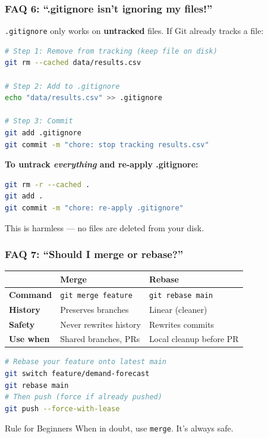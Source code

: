 \documentclass{beamer}
\begin{document}
\begin{frame}[fragile]
\frametitle{FAQ 6: ``.gitignore isn't ignoring my files!''}

\texttt{.gitignore} only works on \textbf{untracked} files. If Git already tracks a file:

\begin{lstlisting}[language=bash]
# Step 1: Remove from tracking (keep file on disk)
git rm --cached data/results.csv

# Step 2: Add to .gitignore
echo "data/results.csv" >> .gitignore

# Step 3: Commit
git add .gitignore
git commit -m "chore: stop tracking results.csv"
\end{lstlisting}

\textbf{To untrack \textit{everything} and re-apply .gitignore:}
\begin{lstlisting}[language=bash]
git rm -r --cached .
git add .
git commit -m "chore: re-apply .gitignore"
\end{lstlisting}

\small This is harmless --- no files are deleted from your disk.
\end{frame}

\begin{frame}[fragile]
\frametitle{FAQ 7: ``Should I merge or rebase?''}

\begin{table}[h]
\centering
\small
\begin{tabular}{lll}
\toprule
 & \textbf{Merge} & \textbf{Rebase} \\
\midrule
\textbf{Command} & \texttt{git merge feature} & \texttt{git rebase main} \\
\textbf{History} & Preserves branches & Linear (cleaner) \\
\textbf{Safety} & Never rewrites history & Rewrites commits \\
\textbf{Use when} & Shared branches, PRs & Local cleanup before PR \\
\bottomrule
\end{tabular}
\end{table}

\begin{lstlisting}[language=bash]
# Rebase your feature onto latest main
git switch feature/demand-forecast
git rebase main
# Then push (force if already pushed)
git push --force-with-lease
\end{lstlisting}

\begin{block}{Rule for Beginners}
When in doubt, use \texttt{merge}. It's always safe.
\end{block}
\end{frame}
\end{document}
